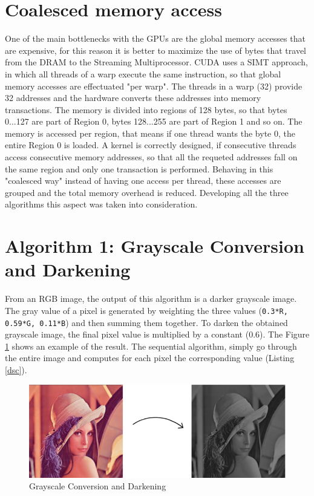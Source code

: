 \documentclass[a4paper]{article}
\begin{document}
\section{Coalesced memory access}
\label{sec:cma}
One of the main bottlenecks with the GPUs are the global memory accesses that are expensive, for this reason it is better to maximize the use of bytes that travel from the DRAM to the Streaming Multiprocessor. CUDA uses a SIMT approach, in which all threads of a warp execute the same instruction, so that global memory accesses are effectuated "per warp". The threads in a warp (32) provide 32 addresses and the hardware converts these addresses into memory transactions. The memory is divided into regions of 128 bytes, so that bytes 0...127 are part of Region 0, bytes 128...255 are part of Region 1 and so on. The memory is accessed per region, that means if one thread wants the byte 0, the entire Region 0 is loaded. A kernel is correctly designed, if consecutive threads access consecutive memory addresses, so that all the requeted addresses fall on the same region and only one transaction is performed. Behaving in this "coalesced way" instead of having one access per thread, these accesses are grouped and the total memory overhead is reduced. Developing all the three algorithms this aspect was taken into consideration.

\section{Algorithm 1: Grayscale Conversion and Darkening}
\label{sec:gcd}
From an RGB image, the output of this algorithm is a darker grayscale image.
The gray value of a pixel is generated by weighting the three values (\texttt{0.3*R, 0.59*G, 0.11*B}) and then summing them together. To darken the obtained grayscale image, the final pixel value is multiplied by a constant (0.6). The Figure \ref{fig:dark} shows an example of the result. The sequential algorithm, simply go through the entire image and computes for each pixel the corresponding value (Listing \ref{dsc}).

\begin{figure}[!ht]
    \centering
    \includegraphics[width=0.7\linewidth]{dark}
    \caption{Grayscale Conversion and Darkening}
    \label{fig:dark}
\end{figure}
\FloatBarrier
\end{document}
